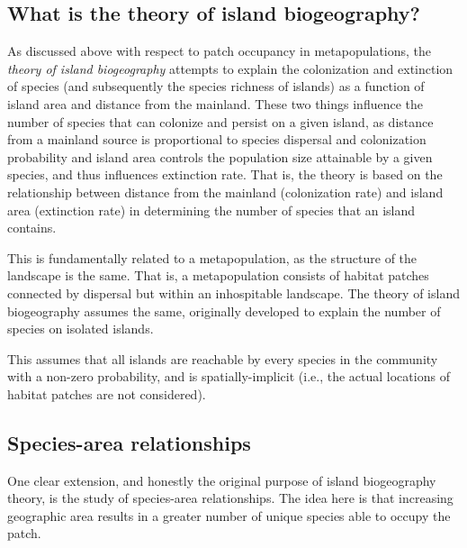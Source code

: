 \documentclass[12pt]{article}
\begin{document}
\clearpage
\subsection*{What is the theory of island biogeography?}

As discussed above with respect to patch occupancy in metapopulations, the \textit{theory of island biogeography} attempts to explain the colonization and extinction of species (and subsequently the species richness of islands) as a function of island area and distance from the mainland. These two things influence the number of species that can colonize and persist on a given island, as distance from a mainland source is proportional to species dispersal and colonization probability and island area controls the population size attainable by a given species, and thus influences extinction rate. That is, the theory is based on the relationship between distance from the mainland (colonization rate) and island area (extinction rate) in determining the number of species that an island contains. 



This is fundamentally related to a metapopulation, as the structure of the landscape is the same. That is, a metapopulation consists of habitat patches connected by dispersal but within an inhospitable landscape. The theory of island biogeography assumes the same, originally developed to explain the number of species on isolated islands. 



This assumes that all islands are reachable by every species in the community with a non-zero probability, and is spatially-implicit (i.e., the actual locations of habitat patches are not considered). 
















\bigskip

\subsection*{Species-area relationships}

One clear extension, and honestly the original purpose of island biogeography theory, is the study of species-area relationships. The idea here is that increasing geographic area results in a greater number of unique species able to occupy the patch. 
\end{document}
